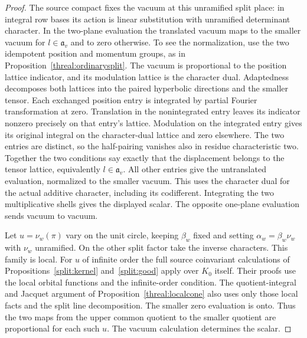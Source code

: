 \begin{proof}
The source compact fixes the vacuum at this unramified split place:
in integral row bases its action is linear substitution with
unramified determinant character. In the two-plane evaluation the
translated vacuum maps to the smaller vacuum for
\(l\in\mathfrak a_v\) and to zero otherwise. To see the normalization,
use the two idempotent position and momentum groups, as in
Proposition~\ref{threal:ordinarysplit}. The vacuum is proportional
to the position lattice indicator, and its modulation lattice is
the character dual. Adaptedness decomposes both lattices into the
paired hyperbolic directions and the smaller tensor. Each exchanged
position entry is integrated by partial Fourier transformation at
zero. Translation in the nonintegrated entry leaves its indicator
nonzero precisely on that entry's lattice. Modulation on the
integrated entry gives its original integral on the character-dual
lattice and zero elsewhere. The two entries are distinct, so the
half-pairing vanishes also in residue characteristic two. Together
the two conditions say exactly that the displacement belongs to
the tensor lattice, equivalently \(l\in\mathfrak a_v\). All other
entries give the untranslated evaluation, normalized to the smaller
vacuum. This uses the character dual for the actual additive character,
including its codifferent. Integrating the two multiplicative shells
gives the displayed scalar. The opposite one-plane evaluation sends
vacuum to vacuum.

Let \(u=\nu_w(\pi)\) vary on the unit circle, keeping \(\beta_w\)
fixed and setting \(\alpha_w=\beta_w\nu_w\) with \(\nu_w\) unramified.
On the other split factor take the inverse characters. This family
is local. For \(u\) of infinite order the full source coinvariant
calculations of Propositions~\ref{split:kernel} and~\ref{split:good}
apply over \(K_0\) itself. Their proofs use the local orbital
functions and the infinite-order condition. The quotient-integral
and Jacquet argument of Proposition~\ref{threal:localcone} also uses
only those local facts and the split line decomposition. The smaller
zero evaluation is onto. Thus the two maps from the upper common
quotient to the smaller quotient are proportional for each such
\(u\). The vacuum calculation determines the scalar.


\end{proof}
